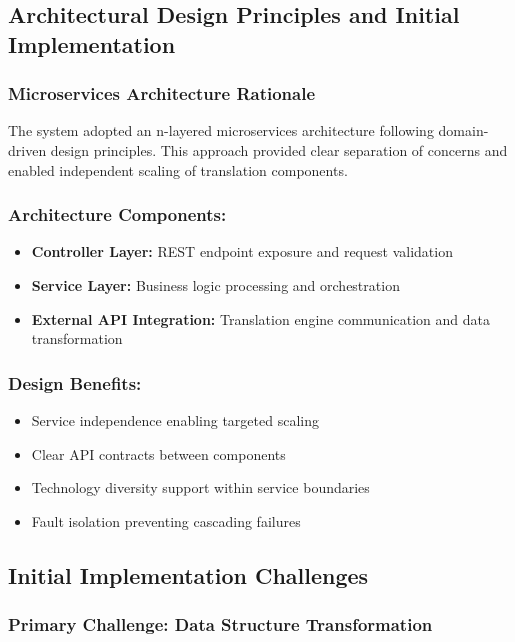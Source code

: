\subsection{Architectural Design Principles and Initial Implementation}

\subsubsection{Microservices Architecture Rationale}

The system adopted an n-layered microservices architecture following domain-driven design principles. This approach provided clear separation of concerns and enabled independent scaling of translation components.

\subsubsection{Architecture Components:}
\begin{itemize}
    \item \textbf{Controller Layer:} REST endpoint exposure and request validation
    \item \textbf{Service Layer:} Business logic processing and orchestration
    \item \textbf{External API Integration:} Translation engine communication and data transformation
\end{itemize}

\subsubsection{Design Benefits:}
\begin{itemize}
    \item Service independence enabling targeted scaling
    \item Clear API contracts between components
    \item Technology diversity support within service boundaries
    \item Fault isolation preventing cascading failures
\end{itemize}

\subsection{Initial Implementation Challenges}

\subsubsection{Primary Challenge: Data Structure Transformation}

